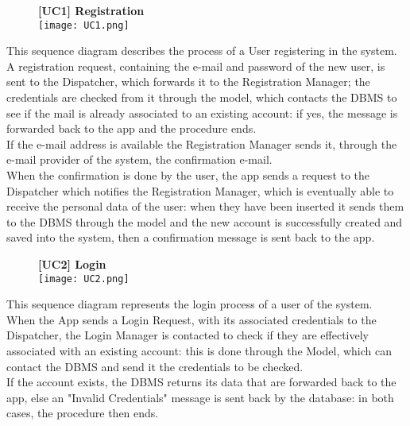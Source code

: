 \documentclass{article}
\begin{document}
\begin{figure}[H]
    \centering
    \textbf{[UC1] Registration} \\
    \texttt{[image: UC1.png]}
\end{figure}
\noindent
This sequence diagram describes the process of a User registering in the system.\\
A registration request, containing the e-mail and password of the new user, is sent to the Dispatcher, which forwards it to the Registration Manager; the credentials are checked from it through the model, which contacts the DBMS to see if the mail is already associated to an existing account: if yes, the message is forwarded back to the app and the procedure ends.\\
If the e-mail address is available the Registration Manager sends it, through the e-mail provider of the system, the confirmation e-mail.\\
When the confirmation is done by the user, the app sends a request to the Dispatcher which notifies the Registration Manager, which is eventually able to receive the personal data of the user: when they have been inserted it sends them to the DBMS through the model and the new account is successfully created and saved into the system, then a confirmation message is sent back to the app.\\

\begin{figure}[H]
    \centering
    \textbf{[UC2] Login} \\
    \texttt{[image: UC2.png]}
\end{figure}
\noindent
This sequence diagram represents the login process of a user of the system.\\
When the App sends a Login Request, with its associated credentials to the Dispatcher, the Login Manager is contacted to check if they are effectively associated with an existing account: this is done through the Model, which can contact the DBMS and send it the credentials to be checked.\\
If the account exists, the DBMS returns its data that are forwarded back to the app, else an "Invalid Credentials" message is sent back by the database: in both cases, the procedure then ends.
\end{document}
